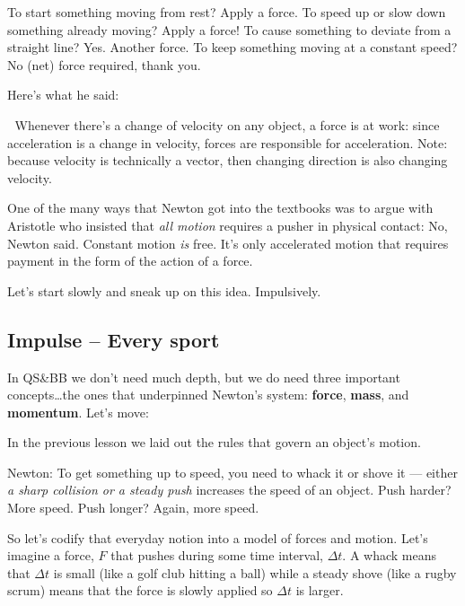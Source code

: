 \documentclass[
  letterpaper,
  DIV=11,
  numbers=noendperiod,
  oneside]{scrreprt}
\begin{document}
To start something moving from rest? Apply a force. To speed up or slow
down something already moving? Apply a force! To cause something to
deviate from a straight line? Yes. Another force. To keep something
moving at a constant speed? No (net) force required, thank you.

Here's what he said:

\begin{tcolorbox}[enhanced jigsaw, toprule=.15mm, opacityback=0, colframe=quarto-callout-important-color-frame, rightrule=.15mm, coltitle=black, bottomtitle=1mm, colbacktitle=quarto-callout-important-color!10!white, bottomrule=.15mm, toptitle=1mm, titlerule=0mm, title={Important}, arc=.35mm, leftrule=.75mm, left=2mm, colback=white, breakable, opacitybacktitle=0.6]

🫵 Whenever there's a change of velocity on any object, a force is at
work: since acceleration is a change in velocity, forces are responsible
for acceleration. Note: because velocity is technically a vector, then
changing direction is also changing velocity.

\end{tcolorbox}

One of the many ways that Newton got into the textbooks was to argue
with Aristotle who insisted that \emph{all motion} requires a pusher in
physical contact: No, Newton said. Constant motion \emph{is} free. It's
only accelerated motion that requires payment in the form of the action
of a force.

Let's start slowly and sneak up on this idea. Impulsively.

\subsection{Impulse -- Every sport}\label{impulse-every-sport}

In QS\&BB we don't need much depth, but we do need three important
concepts\ldots the ones that underpinned Newton's system:
\textbf{force}, \textbf{mass}, and \textbf{momentum}. Let's move:

In the previous lesson we laid out the rules that govern an object's
motion.

Newton: To get something up to speed, you need to whack it or shove it
--- either \emph{a sharp collision or a steady push} increases the speed
of an object. Push harder? More speed. Push longer? Again, more speed.

So let's codify that everyday notion into a model of forces and motion.
Let's imagine a force, \(F\) that pushes during some time interval,
\(\Delta t\). A whack means that \(\Delta t\) is small (like a golf club
hitting a ball) while a steady shove (like a rugby scrum) means that the
force is slowly applied so \(\Delta t\) is larger.
\end{document}
